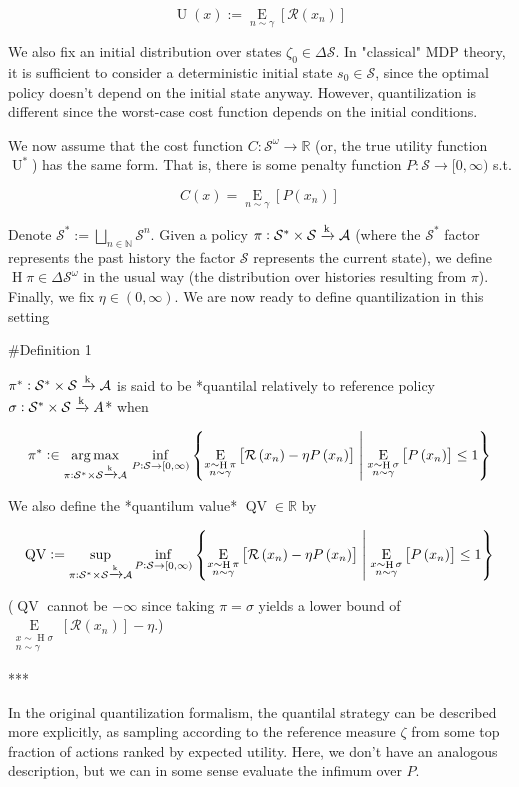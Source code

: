 \documentclass[a4paper]{article}
\newcommand{\AP}[1]{\left(#1\right)}
\newcommand{\AB}[1]{\left[#1\right]}
\newcommand{\ACM}[2]{\left\{#1\;\middle\vert\;#2\right\}}
\newcommand{\Ea}[2]{\underset{#1}{\operatorname{E}}\AB{#2}}
\newcommand{\Argmax}[1]{\underset{#1}{\operatorname{arg\,max}}\,}
\newcommand{\Nats}{\mathbb{N}}
\newcommand{\Reals}{\mathbb{R}}
\newcommand{\K}{\xrightarrow{\textnormal{k}}}
\newcommand{\A}{\mathcal{A}}
\newcommand{\St}{\mathcal{S}}
\newcommand{\R}{\mathcal{R}}
\newcommand{\Pe}{P}
\newcommand{\Ut}{\operatorname{U}}
\newcommand{\Co}{C}
\newcommand{\QV}{\operatorname{QV}}
\DeclareMathOperator{\Hi}{H}
\begin{document}
$$\Ut(x):=\Ea{n\sim\gamma}{\R\AP{x_n}}$$

We also fix an initial distribution over states $\zeta_0 \in \Delta \St$. In "classical" MDP theory, it is sufficient to consider a deterministic initial state $s_0 \in \St$, since the optimal policy doesn't depend on the initial state anyway. However, quantilization is different since the worst-case cost function depends on the initial conditions.

We now assume that the cost function $\Co: \St^\omega \rightarrow \Reals$ (or, the true utility function $\Ut^*$) has the same form. That is, there is some penalty function $\Pe: \St \rightarrow [0,\infty)$ s.t.

$$\Co(x) = \Ea{n\sim\gamma}{\Pe\AP{x_n}}$$

Denote $\St^*:=\bigsqcup_{n\in\Nats}\St^n$. Given a policy $\pi: \St^*\times\St \K \A$ (where the $\St^*$ factor represents the past history the factor $\St$ represents the current state), we define $\Hi{\pi} \in \Delta\St^\omega$ in the usual way (the distribution over histories resulting from $\pi$). Finally, we fix $\eta \in (0,\infty)$. We are now ready to define quantilization in this setting

\#Definition 1

$\pi^* : \St^*\times\St \K \A$ is said to be *quantilal relatively to reference policy $\sigma: \St^*\times\St \K A$* when

$$\pi^* :\in \Argmax{\pi: \St^*\times\St \K \A}\inf_{\Pe:\St\rightarrow[0,\infty)}\ACM{\Ea{\substack{x\sim\Hi{\pi}\\n\sim\gamma}}{\R\AP{x_n}-\eta\Pe\AP{x_n}}}{\Ea{\substack{x\sim\Hi{\sigma}\\n\sim\gamma}}{\Pe\AP{x_n}}\leq1}$$

We also define the *quantilum value* $\QV \in \Reals$ by

$$\QV := \sup_{\pi: \St^*\times\St \K \A}\inf_{\Pe:\St\rightarrow[0,\infty)}\ACM{\Ea{\substack{x\sim\Hi{\pi}\\n\sim\gamma}}{\R\AP{x_n}-\eta\Pe\AP{x_n}}}{\Ea{\substack{x\sim\Hi{\sigma}\\n\sim\gamma}}{\Pe\AP{x_n}}\leq1}$$

($\QV$ cannot be $-\infty$ since taking $\pi=\sigma$ yields a lower bound of $\Ea{\substack{x\sim\Hi{\sigma}\\n\sim\gamma}}{\R\AP{x_n}}-\eta$.)

***

In the original quantilization formalism, the quantilal strategy can be described more explicitly, as sampling according to the reference measure $\zeta$ from some top fraction of actions ranked by expected utility. Here, we don't have an analogous description, but we can in some sense evaluate the infimum over $\Pe$.
\end{document}
